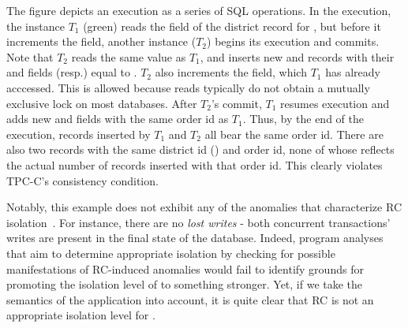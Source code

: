 
The figure depicts an execution as a series of SQL operations. In the
execution, the  instance $T_1$ (green) reads the
 field of the district record for , but
before it increments the field, another  instance
($T_2$) begins its execution and commits. Note that $T_2$ reads the
same  value as $T_1$, and inserts new  and
 records with their  and  fields
(resp.) equal to . $T_2$ also increments the
 field, which $T_1$ has already acccessed. This is
allowed because reads typically do not obtain a mutually exclusive
lock on most databases. After $T_2$'s commit, $T_1$ resumes execution
and adds new  and  fields with the same order
id as $T_1$. Thus, by the end of the execution, 
records inserted by $T_1$ and $T_2$ all bear the same order id. There
are also two  records with the same district id ()
and order id, none of whose  reflects the actual number
of  records inserted with that order id.  This clearly
violates TPC-C's consistency condition.

Notably, this example does not exhibit any of the anomalies that
characterize RC isolation~\cite{berenson}. For instance, there are no
\emph{lost writes} - both concurrent transactions' writes are present
in the final state of the database. Indeed, program analyses that aim
to determine appropriate isolation by checking for possible
manifestations of RC-induced anomalies would fail to identify grounds
for promoting the isolation level of  to something
stronger.  Yet, if we take the semantics of the application into
account, it is quite clear that RC is not an appropriate isolation
level for .

